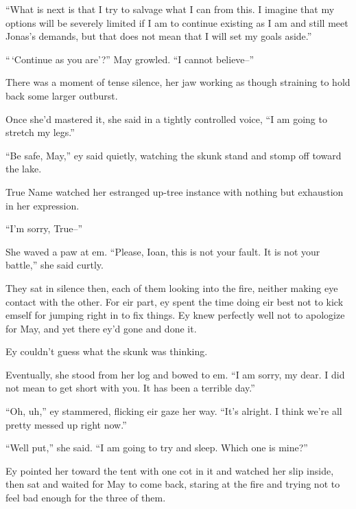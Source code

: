 ``What is next is that I try to salvage what I can from this. I imagine that my options will be severely limited if I am to continue existing as I am and still meet Jonas's demands, but that does not mean that I will set my goals aside.''

``\,`Continue as you are'?'' May growled. ``I cannot believe--''

There was a moment of tense silence, her jaw working as though straining to hold back some larger outburst.

Once she'd mastered it, she said in a tightly controlled voice, ``I am going to stretch my legs.''

``Be safe, May,'' ey said quietly, watching the skunk stand and stomp off toward the lake.

True Name watched her estranged up-tree instance with nothing but exhaustion in her expression.

``I'm sorry, True--''

She waved a paw at em. ``Please, Ioan, this is not your fault. It is not your battle,'' she said curtly.

They sat in silence then, each of them looking into the fire, neither making eye contact with the other. For eir part, ey spent the time doing eir best not to kick emself for jumping right in to fix things. Ey knew perfectly well not to apologize for May, and yet there ey'd gone and done it.

Ey couldn't guess what the skunk was thinking.

Eventually, she stood from her log and bowed to em. ``I am sorry, my dear. I did not mean to get short with you. It has been a terrible day.''

``Oh, uh,'' ey stammered, flicking eir gaze her way. ``It's alright. I think we're all pretty messed up right now.''

``Well put,'' she said. ``I am going to try and sleep. Which one is mine?''

Ey pointed her toward the tent with one cot in it and watched her slip inside, then sat and waited for May to come back, staring at the fire and trying not to feel bad enough for the three of them.
